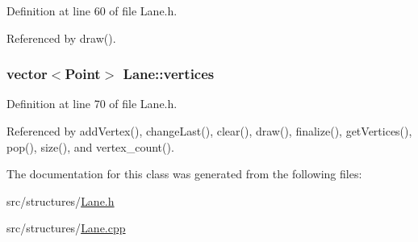 \-Definition at line 60 of file \-Lane.\-h.



\-Referenced by draw().

\hypertarget{class_lane_a77c7a2a168f611cebd7a8bccdf17dedb}{
\subsubsection[{vertices}]{\setlength{\rightskip}{0pt plus 5cm}vector$<$\-Point$>$ {\bf \-Lane\-::vertices}}}
\label{class_lane_a77c7a2a168f611cebd7a8bccdf17dedb}


\-Definition at line 70 of file \-Lane.\-h.



\-Referenced by add\-Vertex(), change\-Last(), clear(), draw(), finalize(), get\-Vertices(), pop(), size(), and vertex\-\_\-count().



\-The documentation for this class was generated from the following files\-:\begin{DoxyCompactItemize}
\item 
src/structures/\hyperlink{_lane_8h}{\-Lane.\-h}\item 
src/structures/\hyperlink{_lane_8cpp}{\-Lane.\-cpp}\end{DoxyCompactItemize}
